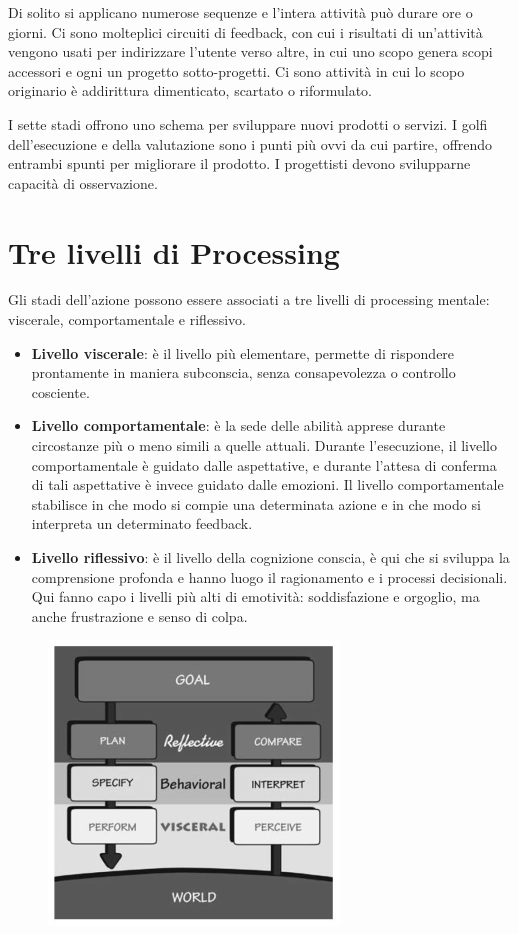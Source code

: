 \documentclass[a4paper,11pt,oneside]{book}
\begin{document}
Di solito si applicano numerose sequenze e l'intera attività può durare ore o giorni. Ci sono molteplici circuiti di feedback, con cui i risultati di un'attività vengono usati per indirizzare l'utente verso altre, in cui uno scopo genera scopi accessori e ogni un progetto sotto-progetti. Ci sono attività in cui lo scopo originario è addirittura dimenticato, scartato o riformulato.

I sette stadi offrono uno schema per sviluppare nuovi prodotti o servizi. I golfi dell'esecuzione e della valutazione sono i punti più ovvi da cui partire, offrendo entrambi spunti per migliorare il prodotto. I progettisti devono svilupparne capacità di osservazione.

\section{Tre livelli di Processing}
Gli stadi dell'azione possono essere associati a tre livelli di processing mentale: viscerale, comportamentale e riflessivo.

\begin{itemize}
	\item \textbf{Livello viscerale}: è il livello più elementare, permette di rispondere prontamente in maniera subconscia, senza consapevolezza o controllo cosciente.
	\item \textbf{Livello comportamentale}: è la sede delle abilità apprese durante circostanze più o meno simili a quelle attuali. Durante l'esecuzione, il livello comportamentale è guidato dalle aspettative, e durante l'attesa di conferma di tali aspettative è invece guidato dalle emozioni. Il livello comportamentale stabilisce in che modo si compie una determinata azione e in che modo si interpreta un determinato feedback.
	\item \textbf{Livello riflessivo}: è il livello della cognizione conscia, è qui che si sviluppa la comprensione profonda e hanno luogo il ragionamento e i processi decisionali. Qui fanno capo i livelli più alti di emotività: soddisfazione e orgoglio, ma anche frustrazione e senso di colpa.
\end{itemize}

\begin{figure}[!h]
	\centering
	\includegraphics[scale=1]{immagini/Livelli di Processing.png}
\end{figure}
\end{document}
